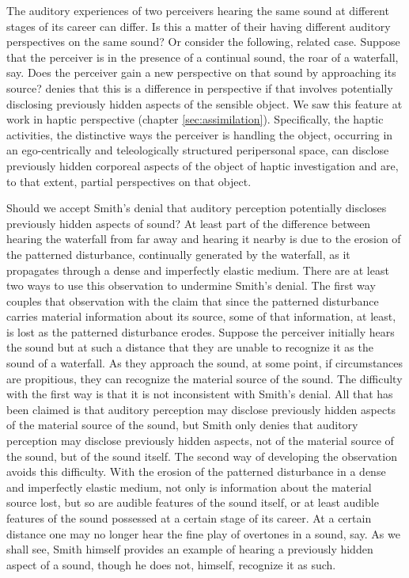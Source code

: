 The auditory experiences of two perceivers hearing the same sound at different stages of its career can differ. Is this a matter of their having different auditory perspectives on the same sound? Or consider the following, related case. Suppose that the perceiver is in the presence of a continual sound, the roar of a waterfall, say. Does the perceiver gain a new perspective on that sound by approaching its source? \citet[135]{Smith:2002sa} denies that this is a difference in perspective if that involves potentially disclosing previously hidden aspects of the sensible object. We saw this feature at work in haptic perspective (chapter \ref{sec:assimilation}). Specifically, the haptic activities, the distinctive ways the perceiver is handling the object, occurring in an ego-centrically and teleologically structured peripersonal space, can disclose previously hidden corporeal aspects of the object of haptic investigation and are, to that extent, partial perspectives on that object. 

Should we accept Smith's denial that auditory perception potentially discloses previously hidden aspects of sound? At least part of the difference between hearing the waterfall from far away and hearing it nearby is due to the erosion of the patterned disturbance, continually generated by the waterfall, as it propagates through a dense and imperfectly elastic medium. There are at least two ways to use this observation to undermine Smith's denial. The first way couples that observation with the claim that since the patterned disturbance carries material information about its source, some of that information, at least, is lost as the patterned disturbance erodes. Suppose the perceiver initially hears the sound but at such a distance that they are unable to recognize it as the sound of a waterfall. As they approach the sound, at some point, if circumstances are propitious, they can recognize the material source of the sound. The difficulty with the first way is that it is not inconsistent with Smith's denial. All that has been claimed is that auditory perception may disclose previously hidden aspects of the material source of the sound, but Smith only denies that auditory perception may disclose previously hidden aspects, not of the material source of the sound, but of the sound itself. The second way of developing the observation avoids this difficulty. With the erosion of the patterned disturbance in a dense and imperfectly elastic medium, not only is information about the material source lost, but so are audible features of the sound itself, or at least audible features of the sound possessed at a certain stage of its career. At a certain distance one may no longer hear the fine play of overtones in a sound, say. As we shall see, Smith himself provides an example of hearing a previously hidden aspect of a sound, though he does not, himself, recognize it as such.

